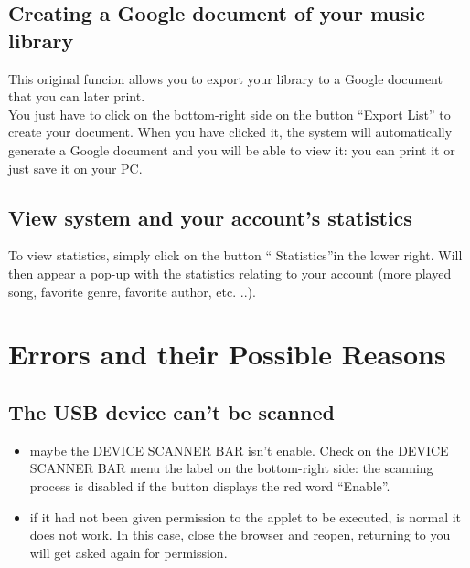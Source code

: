 \subsection{Creating a Google document of your music library}

This original funcion allows you to export your library to a Google document
that you can later print.\\
You just have to click on the bottom-right side on the button ``Export List''
to create your document. When you have clicked it, the system will automatically
generate a Google document and you will be able to view it: you can print it or
just save it on your PC.

\subsection{View system and your account's statistics}

To view statistics, simply click on the button
`` Statistics''in the lower right. Will then appear a pop-up with the
statistics relating to your account
(more played song, favorite genre, favorite author, etc. ..).

\newpage
\section{Errors and their Possible Reasons}

\subsection*{The USB device can't be scanned}
\begin{itemize}
  \item maybe the DEVICE SCANNER BAR isn't enable. Check on the DEVICE SCANNER
  BAR menu the label on the bottom-right side: the scanning process is disabled
  if the button displays the red word ``Enable''.
  \item if it had not been given permission to the applet to be executed, is
   normal it does not work. In this case, close the browser and
   reopen, returning to  you will get asked again for permission.
\end{itemize}

